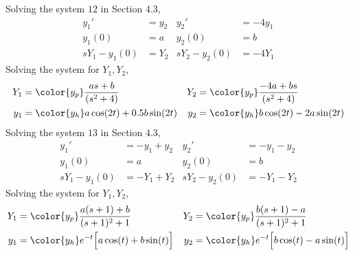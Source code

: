 \begin{enumerate}
\begin{enumerate}
                    Solving the system $ 12 $ in Section 4.3,
                    \begin{align}
                        y_1'          & = y_2   &
                        y_2'          & = -4y_1   \\
                        y_1(0)        & = a     &
                        y_2(0)        & = b       \\
                        sY_1 - y_1(0) & = Y_2   &
                        sY_2 - y_2(0) & = -4Y_1
                    \end{align}
                    Solving the system for $ Y_1, Y_2 $,
                    \begin{align}
                        Y_1 & = \color{y_p}\frac{as + b}{(s^2 + 4)}   &
                        Y_2 & = \color{y_p}\frac{-4a + bs}{(s^2 + 4)}   \\
                        y_1 & = \color{y_h} a\cos(2t) + 0.5b\sin(2t)  &
                        y_2 & = \color{y_h} b\cos(2t) - 2a\sin(2t)
                    \end{align}
                    Solving the system $ 13 $ in Section 4.3,
                    \begin{align}
                        y_1'          & = -y_1 + y_2 &
                        y_2'          & = -y_1 - y_2   \\
                        y_1(0)        & = a          &
                        y_2(0)        & = b            \\
                        sY_1 - y_1(0) & = -Y_1 + Y_2 &
                        sY_2 - y_2(0) & = -Y_1 - Y_2
                    \end{align}
                    Solving the system for $ Y_1, Y_2 $,
                    \begin{align}
                        Y_1 & = \color{y_p}\frac{a(s+1) + b}{(s+1)^2 + 1}          &
                        Y_2 & = \color{y_p}\frac{b(s+1) - a}{(s+1)^2 + 1}            \\
                        y_1 & = \color{y_h} e^{-t}\Big[ a\cos(t) + b\sin(t) \Big]  &
                        y_2 & = \color{y_h} e^{-t} \Big[ b\cos(t) - a\sin(t) \Big]
                    \end{align}


\end{enumerate}
\end{enumerate}
